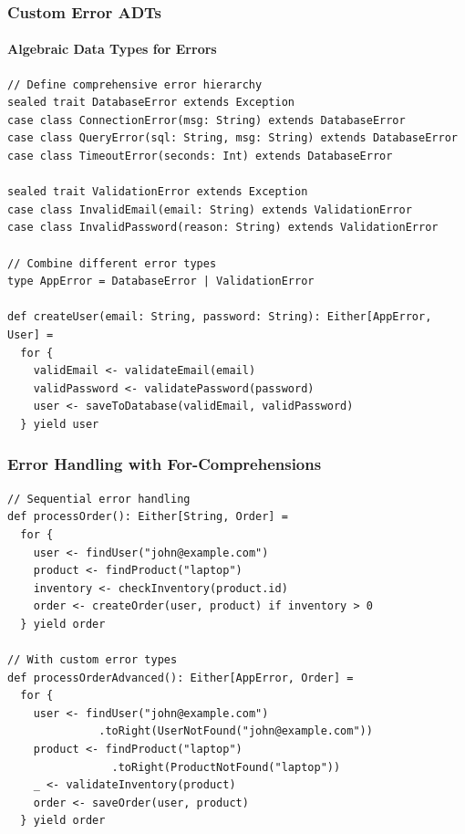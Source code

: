 \documentclass{beamer}
\begin{document}
\begin{frame}[fragile]
\frametitle{Custom Error ADTs}
\framesubtitle{Algebraic Data Types for Errors}

\begin{lstlisting}[style=scalaStyle]
// Define comprehensive error hierarchy
sealed trait DatabaseError extends Exception
case class ConnectionError(msg: String) extends DatabaseError
case class QueryError(sql: String, msg: String) extends DatabaseError
case class TimeoutError(seconds: Int) extends DatabaseError

sealed trait ValidationError extends Exception
case class InvalidEmail(email: String) extends ValidationError
case class InvalidPassword(reason: String) extends ValidationError

// Combine different error types
type AppError = DatabaseError | ValidationError

def createUser(email: String, password: String): Either[AppError, User] = 
  for {
    validEmail <- validateEmail(email)
    validPassword <- validatePassword(password)
    user <- saveToDatabase(validEmail, validPassword)
  } yield user
\end{lstlisting}

\end{frame}

\begin{frame}[fragile]
\frametitle{Error Handling with For-Comprehensions}

\begin{lstlisting}[style=scalaStyle]
// Sequential error handling
def processOrder(): Either[String, Order] = 
  for {
    user <- findUser("john@example.com")
    product <- findProduct("laptop")
    inventory <- checkInventory(product.id)
    order <- createOrder(user, product) if inventory > 0
  } yield order

// With custom error types
def processOrderAdvanced(): Either[AppError, Order] = 
  for {
    user <- findUser("john@example.com")
              .toRight(UserNotFound("john@example.com"))
    product <- findProduct("laptop")
                .toRight(ProductNotFound("laptop"))
    _ <- validateInventory(product)
    order <- saveOrder(user, product)
  } yield order
\end{lstlisting}

\end{frame}
\end{document}
